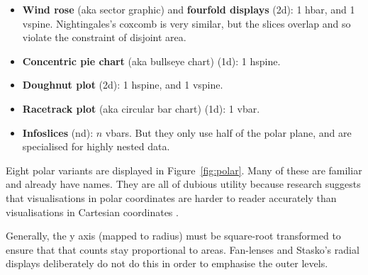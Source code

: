 \documentclass[journal]{vgtc}
\begin{document}
\begin{itemize}
  \setlength{\itemsep}{0em}
  
  \item {\bf Wind rose} (aka sector graphic) \citep{lalanne:1843} and {\bf fourfold displays} \citep{friendly:1995} (2d): 1 hbar, and 1 vspine. Nightingales's coxcomb \citep{nightingale:1857} is very similar, but the slices overlap and so violate the constraint of disjoint area.

  \item {\bf Concentric pie chart} (aka bullseye chart) (1d): 1 hspine.

  \item {\bf Doughnut plot} (2d): 1 hspine, and 1 vspine.

  \item {\bf Racetrack plot} (aka circular bar chart) (1d): 1 vbar.

  \item {\bf Infoslices} \citep{andrews:1998} (nd): $n$ vbars. But they only use half of the polar plane, and are specialised for highly nested data.

\end{itemize}

\noindent Eight polar variants are displayed in Figure~\ref{fig:polar}. Many of these are familiar and already have names. They are all of dubious utility because research suggests that visualisations in polar coordinates are harder to reader accurately than visualisations in Cartesian coordinates \citep{diehl:2010}.

Generally, the y axis (mapped to radius) must be square-root transformed to ensure that that counts stay proportional to areas. Fan-lenses \citep{lou:2007} and Stasko's radial displays \citep{stasko:2000} deliberately do not do this in order to emphasise the outer levels.
\end{document}
